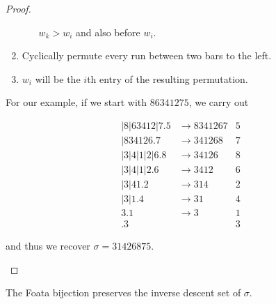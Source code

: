 \documentclass[11pt,leqno,oneside]{amsart}
\numberwithin{thm}{section}
\begin{document}
\begin{proof}
\begin{enumerate}
\begin{enumerate}[label=(\roman*)]
      \(w_k > w_i\) and also before \(w_i\).
    \end{enumerate}
  \item Cyclically permute every run between two bars to the left.
  \item \(w_i\) will be the \(i\)th entry of the resulting permutation.
  \end{enumerate}
  \begin{example}
    For our example, if we start with \(86341275\), we carry out
    \begin{samepage}
      \begin{align*}
        |8|63412|7.5&\rightarrow 8341267&5\\
        |834126.7&\rightarrow 341268&7\\
        |3|4|1|2|6.8&\rightarrow 34126&8\\
        |3|4|1|2.6&\rightarrow 3412&6\\
        |3|41.2&\rightarrow 314&2\\
        |3|1.4&\rightarrow 31&4\\
        3.1&\rightarrow 3&1\\
        .3& &3
      \end{align*}
    \end{samepage}
    and thus we recover \(\sigma = 31426875\).
  \end{example}
\end{proof}
\begin{prop}
  The Foata bijection preserves the inverse descent set of
  \(\sigma\).
\end{prop}
\end{document}
